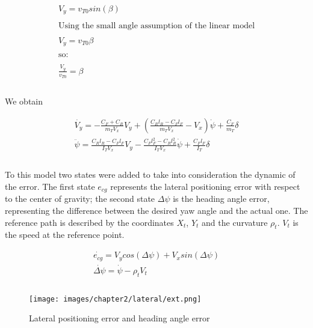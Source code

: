 \documentclass{report}
\begin{document}
\begin{equation}
\begin{aligned}
V_y = v_{T0} sin(\beta)\\\\
\text{Using the small angle assumption of the linear model}\\\\
V_y = v_{T0} \beta\\\\
\text{so: }\\\\
\frac{V_y}{v_{T0}} = \beta\\\\
\end{aligned}
\end{equation}

We obtain

\begin{equation}
\begin{aligned}
\dot{V_y} = -\frac{C_F + C_R}{m_T V_x} V_y + (\frac{C_R l_R - C_F l_F}{m_T V_x} - V_x) \dot{\psi} + \frac{C_F}{m_T} \delta\\
\ddot{\psi} = \frac{C_R l_R - C_F l_F}{I_T V_x} V_y - \frac{C_F l_F^2 - C_R l_R^2}{I_T V_x} \dot{\psi} + \frac{C_F l_F}{I_T} \delta\\\\
\end{aligned}    
\end{equation}

To this model two states were added to take into consideration the dynamic of the error. The first state $e_{cg}$ represents the lateral positioning error with respect to the center of gravity; the second state $\Delta\psi$ is the heading angle error, representing the difference between the desired yaw angle and the actual one. The reference path is described by the coordinates $X_t$, $Y_t$ and the curvature $\rho_t$. $V_t$ is the speed at the reference point.

\begin{equation}
\begin{aligned}
\dot{e_{cg}} = V_y cos(\Delta\psi) + V_x sin(\Delta\psi)\\
\dot{\Delta\psi} = \dot{\psi} - \rho_t V_t\\\\
\end{aligned}    
\end{equation}

\begin{figure}[h!]
    \centering
    \texttt{[image: images/chapter2/lateral/ext.png]}
    \caption{Lateral positioning error and heading angle error}
    \label{fig:latController_ext}
\end{figure}
\end{document}
